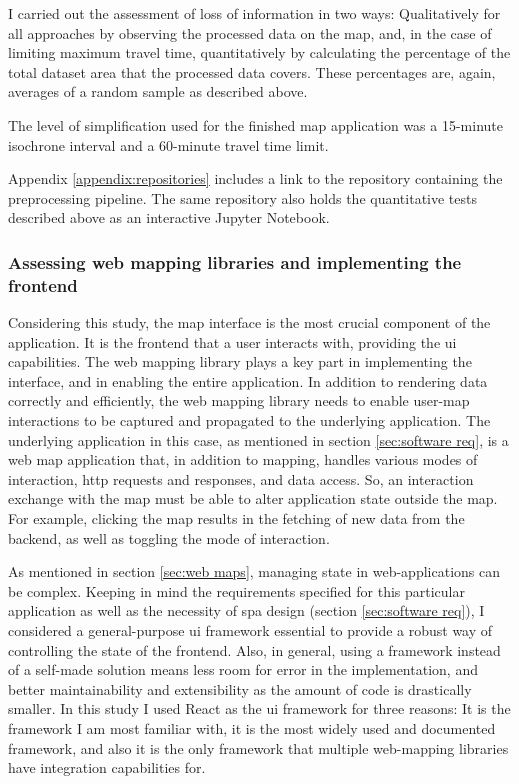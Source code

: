 I carried out the assessment of loss of information in two ways:
Qualitatively for all approaches by observing the processed data on the map,
and, in the case of limiting maximum travel time,
quantitatively by calculating the percentage of the total dataset area
that the processed data covers.
These percentages are, again, averages of a random sample as described above.

The level of simplification used for the finished map application was
a 15-minute isochrone interval and a 60-minute travel time limit.

Appendix \ref{appendix:repositories} includes a link to the repository
containing the preprocessing pipeline.
The same repository also holds the quantitative tests described above
as an interactive Jupyter Notebook.


\subsubsection{Assessing web mapping libraries and implementing the frontend}

Considering this study,
the map interface is the most crucial component of the application.
It is the frontend that a user interacts with,
providing the \acrshort{ui} capabilities.
The web mapping library plays a key part in implementing the interface,
and in enabling the entire application.
In addition to rendering data correctly and efficiently,
the web mapping library needs to enable user-map interactions to be
captured and propagated to the underlying application.
The underlying application in this case, as mentioned in
section \ref{sec:software req},
is a web map application
that, in addition to mapping,
handles various modes of interaction,
\acrshort{http} requests and responses, and data access.
So, an interaction exchange with the map
must be able to alter application state outside the map.
For example,
clicking the map results in the fetching of new data from the backend,
as well as toggling the mode of interaction.

As mentioned in section \ref{sec:web maps},
managing state in web-applications can be complex.
Keeping in mind the requirements specified for this particular application
as well as the necessity of \acrshort{spa} design (section \ref{sec:software req}),
I considered a general-purpose \acrshort{ui} framework
essential to provide a robust way of controlling the state of the frontend.
Also, in general, using a framework instead of a self-made solution
means less room for error in the implementation,
and better maintainability and extensibility as the amount of code is drastically smaller.
In this study I used React \parencite{react} as the \acrshort{ui} framework
for three reasons:
It is the framework I am most familiar with,
it is the most widely used and documented framework,
and also it is the only framework that
multiple web-mapping libraries have integration capabilities for.


